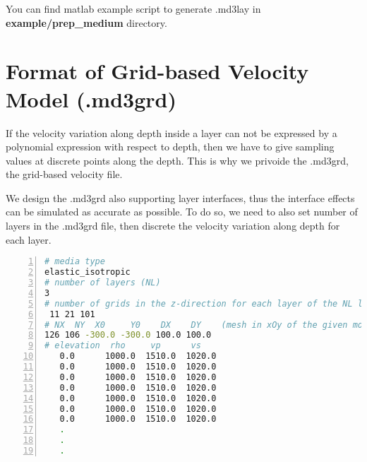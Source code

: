 You can find matlab example script to generate .md3lay in \textbf{example/prep\_medium} directory.

\section{Format of Grid-based Velocity Model (.md3grd)} \label{md3grd}

If the velocity variation along depth inside a layer can not be expressed by a polynomial expression
with respect to depth, then we have to give sampling values at discrete points along the depth.
This is why we privoide the .md3grd, the grid-based velocity file.

We design the .md3grd also supporting layer interfaces,
thus the interface effects can be simulated as accurate as possible.
To do so, we need to also set number of layers in the .md3grd file,
then discrete the velocity variation along depth for each layer.


\begin{lstlisting}[language=bash, caption=Example of .mdgrd file,
   numbers=left, numbersep=5pt,numberstyle=\tiny\color{codegray}, commentstyle=\color{codegreen},
    label={lst_medium_md3grd},
   frame=tb]
# media type   
elastic_isotropic
# number of layers (NL)
3
# number of grids in the z-direction for each layer of the NL layers
 11 21 101
# NX  NY  X0     Y0    DX    DY    (mesh in xOy of the given model)
126 106 -300.0 -300.0 100.0 100.0
# elevation  rho     vp      vs  
   0.0      1000.0  1510.0  1020.0
   0.0      1000.0  1510.0  1020.0
   0.0      1000.0  1510.0  1020.0
   0.0      1000.0  1510.0  1020.0
   0.0      1000.0  1510.0  1020.0
   0.0      1000.0  1510.0  1020.0
   0.0      1000.0  1510.0  1020.0
   .
   .
   .
\end{lstlisting}



